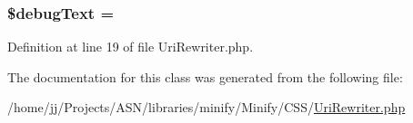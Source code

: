 \subsubsection[{\texorpdfstring{\$debug\+Text}{$debugText}}]{\setlength{\rightskip}{0pt plus 5cm}\$debug\+Text = \textquotesingle{}\textquotesingle{}\hspace{0.3cm}{\ttfamily [static]}}\hypertarget{class_minify___c_s_s___uri_rewriter_ae1e033836f8516eac6ef8cb3aafe5e96}{}\label{class_minify___c_s_s___uri_rewriter_ae1e033836f8516eac6ef8cb3aafe5e96}


Definition at line 19 of file Uri\+Rewriter.\+php.



The documentation for this class was generated from the following file\+:\begin{DoxyCompactItemize}
\item 
/home/jj/\+Projects/\+A\+S\+N/libraries/minify/\+Minify/\+C\+S\+S/\hyperlink{_uri_rewriter_8php}{Uri\+Rewriter.\+php}\end{DoxyCompactItemize}
